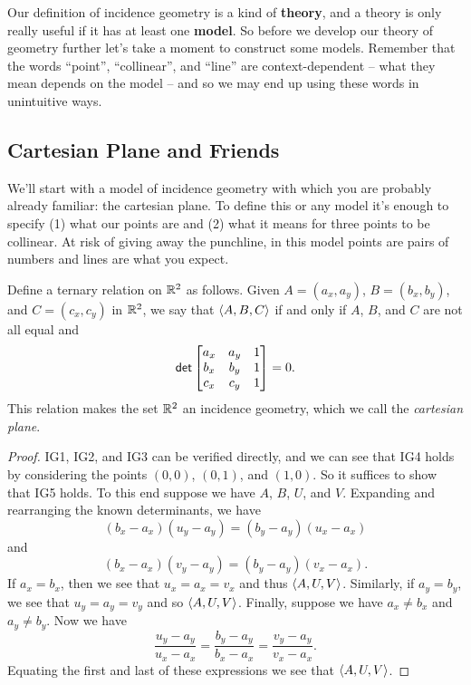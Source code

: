 Our definition of incidence geometry is a kind of \textbf{theory}, and a theory is only really useful if it has at least one \textbf{model}.
So before we develop our theory of geometry further let's take a moment to construct some models.
Remember that the words ``point'', ``collinear'', and ``line'' are context-dependent -- what they mean depends on the model -- and so we may end up using these words in unintuitive ways.



\subsection{Cartesian Plane and Friends}

We'll start with a model of incidence geometry with which you are probably already familiar: the cartesian plane.
To define this or any model it's enough to specify (1) what our points are and (2) what it means for three points to be collinear.
At risk of giving away the punchline, in this model points are pairs of numbers and lines are what you expect.

\begin{prop} \label{prop:rr2-incidence-geo}
Define a ternary relation on \(\mathbb{R}^2\) as follows.
Given \(A = (a_x, a_y)\), \(B = (b_x, b_y)\), and \(C = (c_x, c_y)\) in \(\mathbb{R}^2\), we say that \(\langle A, B, C \rangle\) if and only if \(A\), \(B\), and \(C\) are not all equal and \[ \mathsf{det} \begin{bmatrix} a_x & a_y & 1 \\ b_x & b_y & 1 \\ c_x & c_y & 1 \end{bmatrix} = 0. \]
This relation makes the set \(\mathbb{R}^2\) an incidence geometry, which we call the \emph{cartesian plane}.
\end{prop}

\begin{proof}
IG1, IG2, and IG3 can be verified directly, and we can see that IG4 holds by considering the points \((0,0)\), \((0,1)\), and \((1,0)\).
So it suffices to show that IG5 holds.
To this end suppose we have \(A\), \(B\), \(U\), and \(V\).
Expanding and rearranging the known determinants, we have \[ (b_x - a_x)(u_y - a_y) = (b_y - a_y)(u_x - a_x) \] and \[ (b_x - a_x)(v_y - a_y) = (b_y - a_y)(v_x - a_x). \]
If \(a_x = b_x\), then we see that \(u_x = a_x = v_x\) and thus \(\langle A, U, V \rangle\).
Similarly, if \(a_y = b_y\), we see that \(u_y = a_y = v_y\) and so \(\langle A, U, V \rangle\).
Finally, suppose we have \(a_x \neq b_x\) and \(a_y \neq b_y\).
Now we have \[ \frac{u_y - a_y}{u_x - a_x} = \frac{b_y - a_y}{b_x - a_x} = \frac{v_y - a_y}{v_x - a_x}. \]
Equating the first and last of these expressions we see that \(\langle A, U, V \rangle\).
\end{proof}

